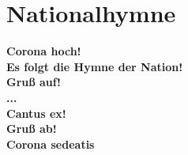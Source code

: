 \section{Nationalhymne}
\textbf{
    Corona hoch!\\
    Es folgt die Hymne der Nation!\\
    Gruß auf!\\
    ...\\
    Cantus ex!\\
    Gruß ab!\\
    Corona sedeatis\\
}